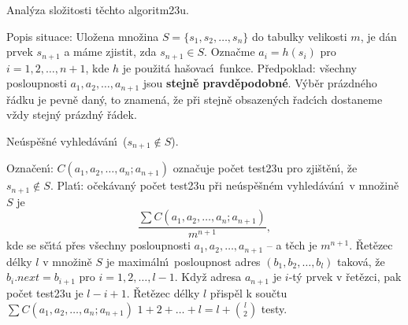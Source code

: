 \subhead
Anal\'yza slo\v zitosti t\v echto algoritm\accent23u.
\endsubhead
\smallskip

\flushpar Popis situace: Ulo\v zena mno\v zina 
$S=\{s_1,s_2,\dots,s_n\}$ do ta\-bulky velikosti $m$, je d\'an 
prvek $s_{n+1}$ a m\'ame zjistit, zda $s_{n+1}\in S$. Ozna\v cme 
$a_i=h(s_i)$ pro $i=1,2,\dots,n+1$, kde $h$ je pou\v zit\'a ha\v sovac\'\i\ 
funkce.\newline 
P\v redpoklad: v\v sechny posloupnosti $a_1,a_2,\dots,a_{n+1}$ jsou 
{\bf stejn\v e pravd\v epodobn\'e}. V\'yb\v er pr\'azdn\'eho \v r\'adku je 
pevn\v e dan\'y, to znamen\'a, \v ze p\v ri stejn\v e obsazen\'ych 
\v radc\'\i ch dostaneme v\v zdy stejn\'y pr\'azdn\'y \v r\'adek.  
\medskip

\subhead
Ne\'usp\v e\v sn\'e vyhled\'av\'an\'\i\ ($s_{n+1}\notin S$). 
\endsubhead
\smallskip

\flushpar Ozna\v cen\'\i : $C(a_1,a_2,\dots,a_n;a_{n+1})$ ozna\v cuje po\v cet 
test\accent23u pro zji\v s\-t\v en\'\i , \v ze $s_{n+1}\notin S$. Plat\'\i : 
o\v cek\'avan\'y po\v cet test\accent23u p\v ri 
ne\'usp\v e\v sn\'em vy\-hled\'av\'an\'\i\ v mno\v zin\v e $S$ je 
$$\frac {\sum C(a_1,a_2,\dots,a_n;a_{n+1})}{m^{n+1}},$$
kde se s\v c\'\i t\'a p\v res v\v sechny posloupnosti $a_1,a_2,\dots
,a_{n+1}$ -- 
a t\v ech je $m^{n+1}$. \newline 
\v Ret\v ezec d\'elky $l$ v mno\v zin\v e $S$ je maxim\'aln\'\i\ posloupnost 
adres $(b_1,b_2,\dots,b_l)$ takov\'a, \v ze $b_i.next=b_{i+1}$ pro 
$i=1,2,\dots,l-1$.
Kdy\v z adresa $a_{n+1}$ je $i$-t\'y prvek v \v ret\v ezci, pak po\v cet 
test\accent23u je $l-i+1$. \v Ret\v ezec d\'elky $l$ p\v risp\v el k sou\v ctu 
$\sum C(a_1,a_2,\dots,a_n;a_{n+1})$ $1+2+\dots+l=l+\binom l2$ testy. 

